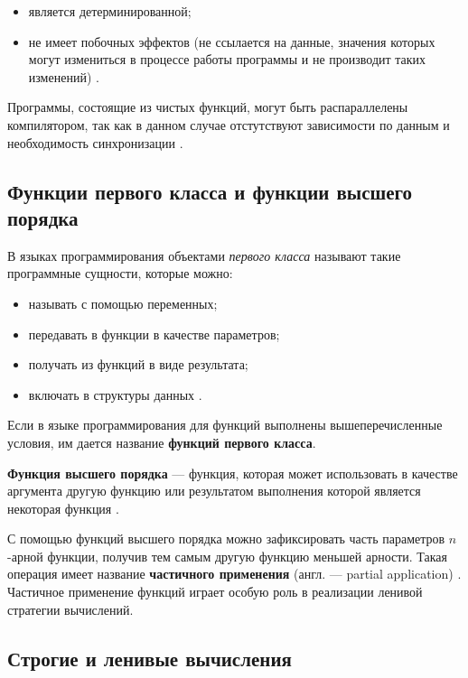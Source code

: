 \begin{itemize}
    \item является детерминированной;
    \item не имеет побочных эффектов (не ссылается на данные, 
     значения которых могут измениться в процессе работы программы
     и не производит таких изменений) \cite{purefunctions}.
\end{itemize}

Программы, состоящие из чистых функций, могут быть распараллелены
компилятором, так как в данном случае отстутствуют зависимости по данным
и необходимость синхронизации \cite[182]{staroletovfunlang}.

\subsection{Функции первого класса и функции высшего порядка}\label{sec:ch1/sec3/subsec3}

В языках программирования объектами \textit{первого класса} называют такие
программные сущности, которые можно:

\begin{itemize}
    \item называть с помощью переменных;
    \item передавать в функции в качестве параметров;
    \item получать из функций в виде результата;
    \item включать в структуры данных \cite[с.~87]{sicp}.
\end{itemize}

Если в языке программирования для функций выполнены вышеперечисленные условия,
им дается название \textbf{функций первого класса}.

\textbf{Функция высшего порядка} --- функция, которая может использовать в
качестве аргумента другую функцию или результатом выполнения которой является
некоторая функция \cite[с.~56]{fp93}.

С помощью функций высшего порядка можно зафиксировать часть параметров $n$-арной
функции, получив тем самым другую функцию меньшей арности.
Такая операция имеет название \textbf{частичного применения}
(англ. --- partial application) \cite{partialapplication}. 
Частичное применение функций играет особую роль в реализации ленивой стратегии вычислений.

\subsection{Строгие и ленивые вычисления}\label{sec:ch1/sec3/subsec4}

